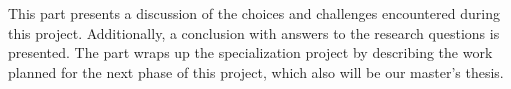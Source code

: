 This part presents a discussion of the choices and challenges encountered during this project. Additionally, a conclusion with answers to the research questions is presented. The part wraps up the specialization project by describing the work planned for the next phase of this project, which also will be our master’s thesis.

\clearpage


\clearpage


\clearpage


\clearpage

